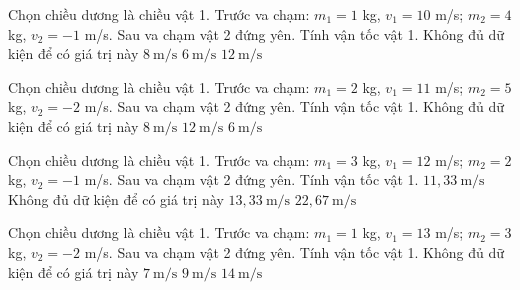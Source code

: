 \begin{ex}
Chọn chiều dương là chiều vật 1. Trước va chạm: $m_1=1$ kg, $v_1=10$ m/s; $m_2=4$ kg, $v_2=-1$ m/s. Sau va chạm vật 2 đứng yên. Tính vận tốc vật 1.
\choice
{Không đủ dữ kiện để có giá trị này}
{$8\ \mathrm{m/s}$}
{\True $6\ \mathrm{m/s}$}
{$12\ \mathrm{m/s}$}
\end{ex}

\begin{ex}
Chọn chiều dương là chiều vật 1. Trước va chạm: $m_1=2$ kg, $v_1=11$ m/s; $m_2=5$ kg, $v_2=-2$ m/s. Sau va chạm vật 2 đứng yên. Tính vận tốc vật 1.
\choice
{Không đủ dữ kiện để có giá trị này}
{$8\ \mathrm{m/s}$}
{$12\ \mathrm{m/s}$}
{\True $6\ \mathrm{m/s}$}
\end{ex}

\begin{ex}
Chọn chiều dương là chiều vật 1. Trước va chạm: $m_1=3$ kg, $v_1=12$ m/s; $m_2=2$ kg, $v_2=-1$ m/s. Sau va chạm vật 2 đứng yên. Tính vận tốc vật 1.
\choice
{\True $11,33\ \mathrm{m/s}$}
{Không đủ dữ kiện để có giá trị này}
{$13,33\ \mathrm{m/s}$}
{$22,67\ \mathrm{m/s}$}
\end{ex}

\begin{ex}
Chọn chiều dương là chiều vật 1. Trước va chạm: $m_1=1$ kg, $v_1=13$ m/s; $m_2=3$ kg, $v_2=-2$ m/s. Sau va chạm vật 2 đứng yên. Tính vận tốc vật 1.
\choice
{Không đủ dữ kiện để có giá trị này}
{\True $7\ \mathrm{m/s}$}
{$9\ \mathrm{m/s}$}
{$14\ \mathrm{m/s}$}
\end{ex}

